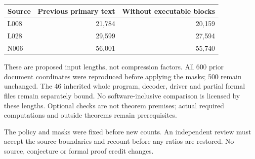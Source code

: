 \documentclass[11pt,a4paper]{article}
\begin{document}
\begin{center}\begin{tabular}{lrr}\toprule
Source & Previous primary text & Without executable blocks\\\midrule
L008 & 21,784 & 20,159\\
L028 & 29,599 & 27,594\\
N006 & 56,001 & 55,740\\\bottomrule\end{tabular}\end{center}
These are proposed input lengths, not compression factors. All 600 prior document coordinates were reproduced before applying the masks; 500 remain unchanged. The 46 inherited whole program, decoder, driver and partial formal files remain separately bound. No software-inclusive comparison is licensed by these lengths. Optional checks are not theorem premises; actual required computations and outside theorems remain prerequisites.

The policy and masks were fixed before new counts. An independent review must accept the source boundaries and recount before any ratios are restored. No source, conjecture or formal proof credit changes.
\end{document}
